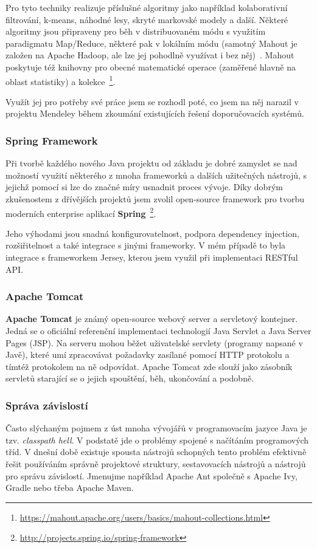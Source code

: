 \documentclass[thesis=M,czech]{FITthesis}[2014/05/07]
\begin{document}
Pro tyto techniky realizuje příslušné algoritmy jako například kolaborativní filtrování, k-means, náhodné lesy, skryté markovské modely a další. Některé algoritmy jsou připraveny pro běh v distribuovaném módu s využitím paradigmatu Map/Reduce, některé pak v lokálním módu (samotný Mahout je založen na Apache Hadoop, ale lze jej pohodlně využívat i bez něj)~\cite{mahouttut}. Mahout poskytuje též knihovny pro obecné matematické operace (zaměřené hlavně na oblast statistiky) a kolekce~\footnote{\url{https://mahout.apache.org/users/basics/mahout-collections.html}}. 

Využít jej pro potřeby své práce jsem se rozhodl poté, co jsem na něj narazil v projektu Mendeley během zkoumání existujících řešení doporučovacích systémů. 

\subsubsection{Spring Framework}
Při tvorbě každého nového Java projektu od základu je dobré zamyslet se nad možností využití některého z mnoha frameworků a dalších užitečných nástrojů, s jejichž pomocí si lze do značné míry usnadnit proces vývoje. Díky dobrým zkušenostem z dřívějších projektů jsem zvolil open-source framework pro tvorbu moderních enterprise aplikací \textbf{Spring}~\footnote{\url{http://projects.spring.io/spring-framework}}. 

Jeho výhodami jsou snadná konfigurovatelnost, podpora dependency injection, rozšiřitelnost a také integrace s jinými frameworky. V mém případě to byla integrace s frameworkem Jersey, kterou jsem využil při implementaci RESTful API.

\subsubsection{Apache Tomcat}
\textbf{Apache Tomcat} je známý open-source webový server a servletový kontejner. Jedná se o oficiální referenční implementaci technologií Java Servlet a Java Server Pages (JSP). Na serveru mohou běžet uživatelské servlety (programy napsané v Javě), které umí zpracovávat požadavky zasílané pomocí HTTP protokolu a tímtéž protokolem na ně odpovídat. Apache Tomcat zde slouží jako zásobník servletů starající se o jejich spouštění, běh, ukončování a podobně.

\subsubsection{Správa závislostí}
Často slýchaným pojmem z úst mnoha vývojářů v programovacím jazyce Java je tzv. \emph{classpath hell}. V podstatě jde o problémy spojené s načítáním programových tříd. V dnešní době existuje spousta nástrojů schopných tento problém efektivně řešit používáním správně projektové struktury, sestavovacích nástrojů a nástrojů pro správu závislostí. Jmenujme například Apache Ant společně s Apache Ivy, Gradle nebo třeba Apache Maven.
\end{document}
